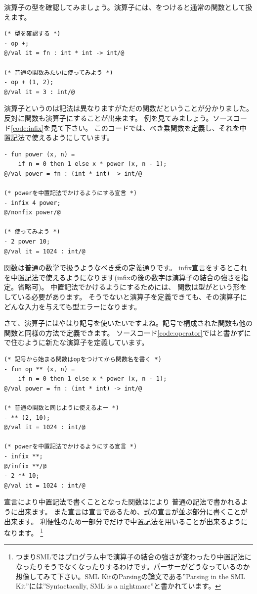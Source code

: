 \documentclass[11pt,a4paper]{jarticle}
\begin{document}
演算子の型を確認してみましょう。演算子には、をつけると通常の関数として扱えます。
\begin{lstlisting}[caption=演算子を評価する]
(* 型を確認する *)
- op +;
@/val it = fn : int * int -> int/@

(* 普通の関数みたいに使ってみよう *)
- op + (1, 2);
@/val it = 3 : int/@
\end{lstlisting}

演算子というのは記法は異なりますがただの関数だということが分かりました。
反対に関数も演算子にすることが出来ます。
例を見てみましょう。ソースコード\ref{code:infix}を見て下さい。
このコードでは、べき乗関数を定義し、それを中置記法で使えるようにしています。

\begin{lstlisting}[caption=演算子の定義,label=code:infix]
- fun power (x, n) =
    if n = 0 then 1 else x * power (x, n - 1);
@/val power = fn : (int * int) -> int/@

(* powerを中置記法でかけるようにする宣言 *)
- infix 4 power;
@/nonfix power/@

(* 使ってみよう *)
- 2 power 10;
@/val it = 1024 : int/@
\end{lstlisting}

関数は普通の数学で扱うようなべき乗の定義通りです。
infix宣言をするとこれを中置記法で使えるようになります(infixの後の数字は演算子の結合の強さを指定。省略可)。
中置記法でかけるようにするためには、
関数は型がという形をしている必要があります。
そうでないと演算子を定義できても、その演算子にどんな入力を与えても型エラーになります。

さて、演算子にはやはり記号を使いたいですよね。記号で構成された関数も他の関数と同様の方法で定義できます。
ソースコード\ref{code:operator}ではと書かずに
\prog{**}で住むように新たな演算子を定義しています。

\begin{lstlisting}[caption=演算子の定義,label=code:operator]
(* 記号から始まる関数はopをつけてから関数名を書く *)
- fun op ** (x, n) =
    if n = 0 then 1 else x * power (x, n - 1);
@/val power = fn : (int * int) -> int/@

(* 普通の関数と同じように使えるよー *)
- ** (2, 10);
@/val it = 1024 : int/@

(* powerを中置記法でかけるようにする宣言 *)
- infix **;
@/infix **/@
- 2 ** 10;
@/val it = 1024 : int/@
\end{lstlisting}

宣言により中置記法で書くこととなった関数はにより
普通の記法で書かれるように出来ます。
また宣言は宣言であるため、式の宣言が並ぶ部分に書くことが出来ます。
利便性のため一部分でだけで中置記法を用いることが出来るようになります。
\footnote{つまりSMLではプログラム中で演算子の結合の強さが変わったり中置記法になったりそうでなくなったりするわけです。パーサーがどうなっているのか想像してみて下さい。SML KitのParsingの論文である''Parsing in the SML Kit''には''Syntactacally, SML is a nightmare''と書かれています。}
\end{document}
